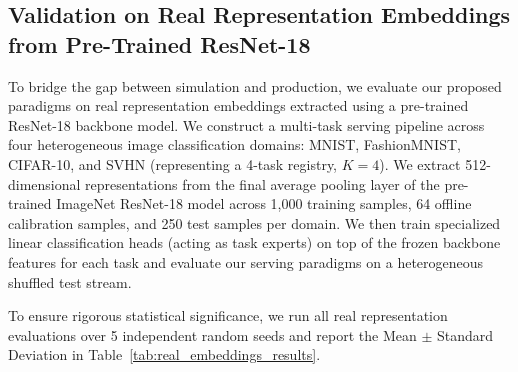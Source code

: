 \subsection{Validation on Real Representation Embeddings from Pre-Trained ResNet-18}
To bridge the gap between simulation and production, we evaluate our proposed paradigms on real representation embeddings extracted using a pre-trained ResNet-18 backbone model. We construct a multi-task serving pipeline across four heterogeneous image classification domains: MNIST, FashionMNIST, CIFAR-10, and SVHN (representing a 4-task registry, $K=4$). We extract 512-dimensional representations from the final average pooling layer of the pre-trained ImageNet ResNet-18 model across 1,000 training samples, 64 offline calibration samples, and 250 test samples per domain. We then train specialized linear classification heads (acting as task experts) on top of the frozen backbone features for each task and evaluate our serving paradigms on a heterogeneous shuffled test stream.

To ensure rigorous statistical significance, we run all real representation evaluations over 5 independent random seeds and report the Mean $\pm$ Standard Deviation in Table~\ref{tab:real_embeddings_results}.

\begin{table}[h]
\caption{Joint Mean Accuracy (\%) on real representation embeddings extracted from an ImageNet-pre-trained ResNet-18 model across MNIST, FashionMNIST, CIFAR-10, and SVHN. All results are averaged over 5 independent random seeds.}
\label{tab:real_embeddings_results}
\vskip 0.15in
\begin{center}
\begin{small}
\begin{sc}
\end{sc}
\end{small}
\end{center}
\vskip -0.1in
\end{table}

